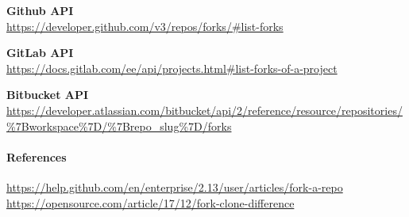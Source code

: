 \textbf{Github API}\\
\href{https://developer.github.com/v3/repos/forks/\#list-forks}{https://developer.github.com/v3/repos/forks/\#list-forks}

\textbf{GitLab API}\\
\href{https://docs.gitlab.com/ee/api/projects.html\#list-forks-of-a-project}{https://docs.gitlab.com/ee/api/projects.html\#list-forks-of-a-project}

\textbf{Bitbucket API}\\
\href{https://developer.atlassian.com/bitbucket/api/2/reference/resource/repositories/\%7Bworkspace\%7D/\%7Brepo_slug\%7D/forks}{https://developer.atlassian.com/bitbucket/api/2/reference/resource/repositories/\%7Bworkspace\%7D/\%7Brepo\_slug\%7D/forks}

\hypertarget{references}{%
\paragraph{References}\label{references}}

\href{https://help.github.com/en/enterprise/2.13/user/articles/fork-a-repo}{https://help.github.com/en/enterprise/2.13/user/articles/fork-a-repo}
\href{https://opensource.com/article/17/12/fork-clone-difference}{https://opensource.com/article/17/12/fork-clone-difference}
